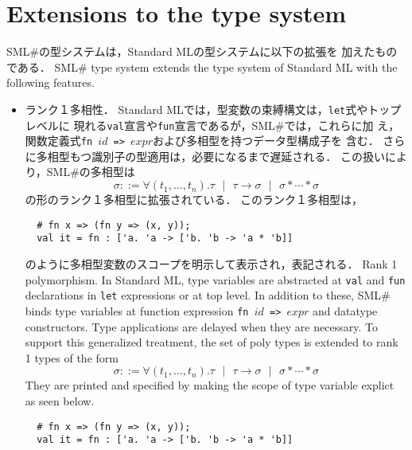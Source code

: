 \documentclass{jbook}
\newcommand{\txt}[2]{#2}
\newcommand{\smlsharp}{SML\#}
\newcommand{\func}{\rightarrow}
\newcommand{\vbar}{\mbox{\ $|$\ }}
\begin{document}
\fi%

\section{\txt{型システムの拡張}{Extensions to the type system}}

\ifjp%
	\smlsharp{}の型システムは，Standard MLの型システムに以下の拡張を
加えたものである．
\else%
	\smlsharp{} type system extends the type system of Standard ML
with the following features.
\fi%

\begin{itemize}
\item 
\ifjp%
	ランク１多相性．
	Standard MLでは，型変数の束縛構文は，{\tt let}式やトップレベルに
現れる{\tt val}宣言や{\tt fun}宣言であるが，\smlsharp{}では，これらに加
え，関数定義式{\tt fn $id$ => $expr$}および多相型を持つデータ型構成子を
含む．
	さらに多相型もつ識別子の型適用は，必要になるまで遅延される．
	この扱いにより，\smlsharp{}の多相型は
\[
\sigma  ::= \forall (t_1,\ldots,t_n).\tau
\vbar \tau \func \sigma 
\vbar \sigma * \cdots * \sigma
\]
の形のランク１多相型に拡張されている．
	このランク１多相型は，
\begin{verbatim}
  # fn x => (fn y => (x, y));
  val it = fn : ['a. 'a -> ['b. 'b -> 'a * 'b]]
\end{verbatim}
のように多相型変数のスコープを明示して表示され，表記される．
\else%
	Rank 1 polymorphism.
	In Standard ML, type variables are abstracted at {\tt val} and
{\tt fun} declarations in {\tt let} expressions or at top level.
	In addition to these,  \smlsharp{} binds type variables at 
function expression {\tt fn $id$ => $expr$} and datatype constructors.
	Type applications are delayed when they are necessary.
	To support this generalized treatment, the set of poly types
is extended to rank 1 types of the form
\[
\sigma  ::= \forall (t_1,\ldots,t_n).\tau
\vbar \tau \func \sigma 
\vbar \sigma * \cdots * \sigma
\]
	They are printed and specified by making the scope of 
type variable explict as seen below.
\begin{verbatim}
  # fn x => (fn y => (x, y));
  val it = fn : ['a. 'a -> ['b. 'b -> 'a * 'b]]
\end{verbatim}
\fi%


\end{itemize}
\end{document}

